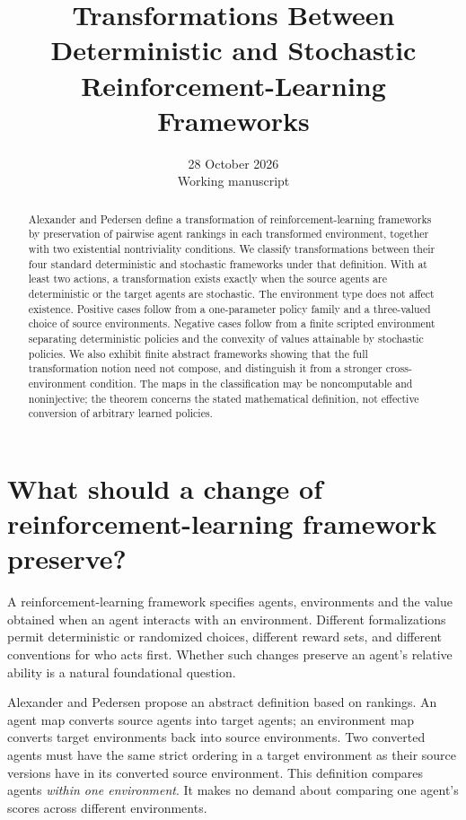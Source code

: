 \documentclass[11pt]{article}
\title{Transformations Between Deterministic and Stochastic\\Reinforcement-Learning Frameworks}
\author{}
\date{28 October 2026\\Working manuscript}
\begin{document}
\maketitle
\begin{abstract}
Alexander and Pedersen define a transformation of reinforcement-learning
frameworks by preservation of pairwise agent rankings in each transformed
environment, together with two existential nontriviality conditions. We
classify transformations between their four standard deterministic and
stochastic frameworks under that definition. With at least two actions,
a transformation exists exactly when the source agents are deterministic
or the target agents are stochastic. The environment type does not affect
existence. Positive cases follow from a one-parameter policy family and
a three-valued choice of source environments. Negative cases follow from
a finite scripted environment separating deterministic policies and the
convexity of values attainable by stochastic policies. We also exhibit
finite abstract frameworks showing that the full transformation notion
need not compose, and distinguish it from a stronger cross-environment
condition. The maps in the classification may be noncomputable and
noninjective; the theorem concerns the stated mathematical definition,
not effective conversion of arbitrary learned policies.
\end{abstract}
\tableofcontents

\section{What should a change of reinforcement-learning framework preserve?}

A reinforcement-learning framework specifies agents, environments and
the value obtained when an agent interacts with an environment.
Different formalizations permit deterministic or randomized choices,
different reward sets, and different conventions for who acts first.
Whether such changes preserve an agent's relative ability is a natural
foundational question.

Alexander and Pedersen \cite{AP} propose an abstract definition based
on rankings. An agent map converts source agents into target agents;
an environment map converts target environments back into source
environments. Two converted agents must have the same strict ordering
in a target environment as their source versions have in its converted
source environment. This definition compares agents \emph{within one
environment}. It makes no demand about comparing one agent's scores
across different environments.
\end{document}
